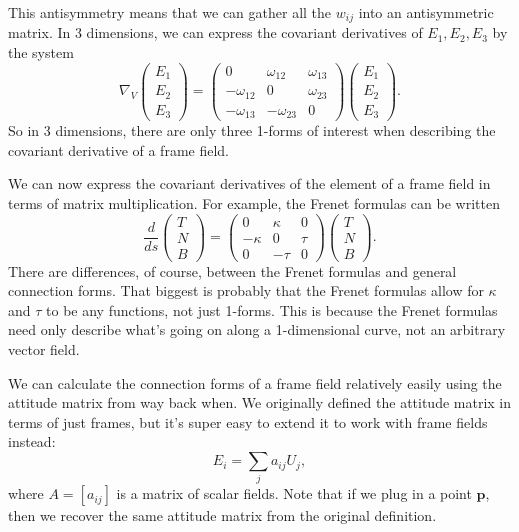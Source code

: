 \documentclass[10pt]{report}
\begin{document}
This antisymmetry means that we can gather all the $w_{ij}$ into an antisymmetric matrix. In 3 dimensions, we can express the covariant derivatives of $E_1,E_2,E_3$ by the system
\[
	\nabla_{V}
	\begin{pmatrix}
		E_1\\E_2\\E_3
	\end{pmatrix}=
\begin{pmatrix}
	0 & \omega_{12}& \omega_{13} \\
	-\omega_{12}&0&\omega_{23}\\
	-\omega_{13}&-\omega_{23}&0
\end{pmatrix}
\begin{pmatrix}
	E_1\\E_2\\E_3
\end{pmatrix}.
\] 
So in 3 dimensions, there are only three 1-forms of interest when describing the covariant derivative of a frame field.

We can now express the covariant derivatives of the element of a frame field in terms of matrix multiplication. For example, the Frenet formulas can be written
\[
\frac{d }{d s} 
\begin{pmatrix}
	T \\ N \\ B
\end{pmatrix} = 
\begin{pmatrix}
	0 & \kappa & 0 \\
	-\kappa &0&\tau \\
	0&-\tau&0
\end{pmatrix}
\begin{pmatrix}
	T \\ N \\ B
\end{pmatrix}.
\] 
There are differences, of course, between the Frenet formulas and general connection forms. That biggest is probably that the Frenet formulas allow for $\kappa$ and $\tau$ to be any functions, not just 1-forms. This is because the Frenet formulas need only describe what's going on along a 1-dimensional curve, not an arbitrary vector field.

We can calculate the connection forms of a frame field relatively easily using the attitude matrix from way back when. We originally defined the attitude matrix in terms of just frames, but it's super easy to extend it to work with frame fields instead:
\[
E_i = \sum_j a_{ij}U_j,
\] where $A = [a_{ij}]$ is a matrix of scalar fields. Note that if we plug in a point $\mathbf{p}$, then we recover the same attitude matrix from the original definition.
\end{document}
